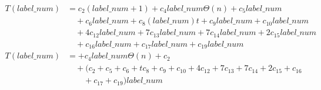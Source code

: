 \begin{subequations}
\label{eq:analyse-detectmarker2-2}
\begin{align}
\label{eq:analyse-detectmarker2-2-1}
T(\mathit{label\_num})& =
c_{2}(\mathit{label\_num} + 1)
+ c_{4}\mathit{label\_num}\Theta(n)
+ c_{5}\mathit{label\_num}
\\
& \quad
+ c_{6}\mathit{label\_num}
+ c_{8}(\mathit{label\_num})t
+ c_{9}\mathit{label\_num}
+ c_{10}\mathit{label\_num}
\nonumber \\
& \quad
+ 4c_{12}\mathit{label\_num}
+ 7c_{13}\mathit{label\_num}
+ 7c_{14}\mathit{label\_num}
+ 2c_{15}\mathit{label\_num}
\nonumber \\
& \quad
+ c_{16}\mathit{label\_num}
+ c_{17}\mathit{label\_num}
+ c_{19}\mathit{label\_num}
\nonumber \\
\label{eq:analyse-detectmarker2-2-2}
T(\mathit{label\_num})& =
+ c_{4}\mathit{label\_num}\Theta(n)
+ c_{2}
\\
& \quad
+ (c_{2} + c_{5} + c_{6} + tc_{8} + c_{9} + c_{10} + 4c_{12} + 7c_{13} + 7c_{14} + 2c_{15} + c_{16}
\nonumber \\
& \quad \quad
 + c_{17} + c_{19})\mathit{label\_num}
\nonumber
\end{align}
\end{subequations}
